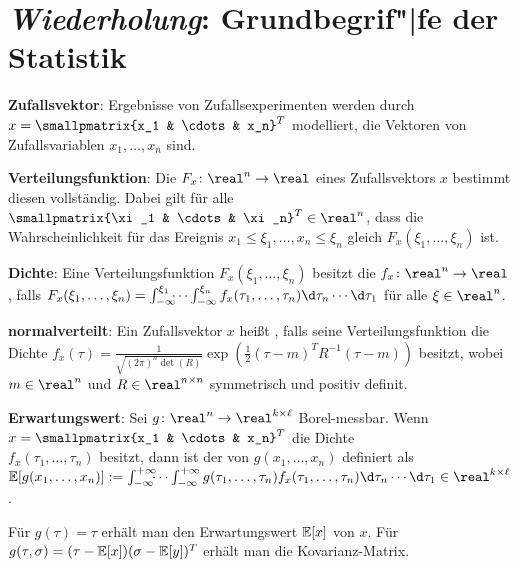 \pagebreak

\section{%
    \emph{Wiederholung}: Grundbegrif"|fe der Statistik%
}

\textbf{Zufallsvektor}:
Ergebnisse von Zufallsexperimenten werden durch 
$x = \smallpmatrix{x_1 & \cdots & x_n}^T$ modelliert, die Vektoren von Zufallsvariablen
$x_1, \dotsc, x_n$ sind.

\textbf{Verteilungsfunktion}:
Die  $F_x\colon \real^n \rightarrow \real$
eines Zufallsvektors $x$ bestimmt diesen vollständig.
Dabei gilt für alle $\smallpmatrix{\xi_1 & \cdots & \xi_n}^T \in \real^n$, dass die
Wahrscheinlichkeit für das Ereignis $x_1 \le \xi_1, \dotsc, x_n \le \xi_n$ gleich
$F_x(\xi_1, \dotsc, \xi_n)$ ist.

\textbf{Dichte}:
Eine Verteilungsfunktion $F_x(\xi_1, \dotsc, \xi_n)$ besitzt die 
$f_x\colon \real^n \rightarrow \real$, falls
$F_x(\xi_1, \dotsc, \xi_n) = \int_{-\infty}^{\xi_1} \!\!\!\dotsb \int_{-\infty}^{\xi_n}
f_x(\tau_1, \dotsc, \tau_n) \d\tau_n \dotsb \d\tau_1$ für alle $\xi \in \real^n$.

\textbf{normalverteilt}:
Ein Zufallsvektor $x$ heißt ,
falls seine Verteilungsfunktion die Dichte
$f_x(\tau) = \frac{1}{\sqrt{(2\pi)^n \det(R)}}
\exp\!\left(\frac{1}{2} (\tau - m)^T R^{-1} (\tau - m)\right)$
besitzt, wobei $m \in \real^n$ und $R \in \real^{n \times n}$ symmetrisch und positiv definit.

\linie

\textbf{Erwartungswert}:
Sei $g\colon \real^n \rightarrow \real^{k \times \ell}$ Borel-messbar.
Wenn $x = \smallpmatrix{x_1 & \cdots & x_n}^T$ die Dichte\\
$f_x(\tau_1, \dotsc, \tau_n)$ besitzt,
dann ist der  von $g(x_1, \dotsc, x_n)$ definiert als\\
$\EE[g(x_1, \dotsc, x_n)] := \int_{-\infty}^{+\infty} \!\!\!\dotsb \int_{-\infty}^{+\infty}
g(\tau_1, \dotsc, \tau_n) f_x(\tau_1, \dotsc, \tau_n) \d\tau_n \dotsb \d\tau_1 \in
\real^{k \times \ell}$.

Für $g(\tau) = \tau$ erhält man den Erwartungswert $\mathbb{E}[x]$ von $x$.
Für $g(\tau, \sigma) = (\tau - \mathbb{E}[x]) (\sigma - \mathbb{E}[y])^T$ erhält man die Kovarianz-Matrix.

